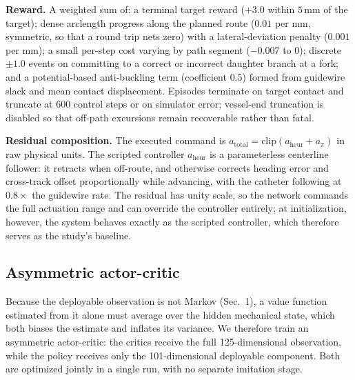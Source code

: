 \textbf{Reward.} A weighted sum of: a terminal target reward ($+3.0$ within $5$\,mm of the
target); dense arclength progress along the planned route ($0.01$ per mm, symmetric, so that a
round trip nets zero) with a lateral-deviation penalty ($0.001$ per mm); a small per-step cost
varying by path segment ($-0.007$ to $0$); discrete $\pm 1.0$ events on committing to a correct
or incorrect daughter branch at a fork; and a potential-based anti-buckling term (coefficient
$0.5$) formed from guidewire slack and mean contact displacement. Episodes terminate on target
contact and truncate at 600 control steps or on simulator error; vessel-end truncation is
disabled so that off-path excursions remain recoverable rather than fatal.

\textbf{Residual composition.} The executed command is
$a_{\mathrm{total}} = \mathrm{clip}\!\left(a_{\mathrm{heur}} + a_{\pi}\right)$ in raw physical
units. The scripted controller $a_{\mathrm{heur}}$ is a parameterless centerline follower: it
retracts when off-route, and otherwise corrects heading error and cross-track offset
proportionally while advancing, with the catheter following at $0.8\times$ the guidewire rate.
The residual has unity scale, so the network commands the full actuation range and can override
the controller entirely; at initialization, however, the system behaves exactly as the scripted
controller, which therefore serves as the study's baseline.

\subsection{Asymmetric actor-critic}
\label{sec:asymmetric}


Because the deployable observation is not Markov (Sec.~1), a value function estimated from it
alone must average over the hidden mechanical state, which both biases the estimate and inflates
its variance. We therefore train an asymmetric actor-critic: the critics receive the full
125-dimensional observation, while the policy receives only the 101-dimensional deployable
component. Both are optimized jointly in a single run, with no separate imitation stage.

